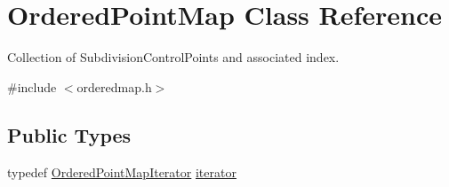 \hypertarget{classOrderedPointMap}{}\section{Ordered\+Point\+Map Class Reference}
\label{classOrderedPointMap}


Collection of Subdivision\+Control\+Points and associated index.  




{\ttfamily \#include $<$orderedmap.\+h$>$}

\subsection*{Public Types}
\begin{DoxyCompactItemize}
\item 
typedef \hyperlink{classOrderedPointMapIterator}{Ordered\+Point\+Map\+Iterator} \hyperlink{classOrderedPointMap_ae58ae7176ea9345af14a8f53bbe57d69}{iterator}
\end{DoxyCompactItemize}

